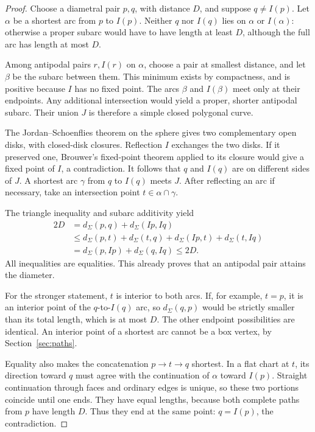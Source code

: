\documentclass[11pt]{article}
\theoremstyle{definition}
\newcommand{\surf}{\Sigma}
\newcommand{\dist}{d_{\surf}}
\begin{document}
\begin{proof}
Choose a diametral pair \(p,q\), with distance \(D\), and suppose
\(q\ne I(p)\). Let \(\alpha\) be a shortest arc from \(p\) to \(I(p)\).
Neither \(q\) nor \(I(q)\) lies on \(\alpha\) or \(I(\alpha)\):
otherwise a proper subarc would have to have length at least \(D\),
although the full arc has length at most \(D\).

Among antipodal pairs \(r,I(r)\) on \(\alpha\), choose a pair at
smallest distance, and let \(\beta\) be the subarc between them.
This minimum exists by compactness, and is positive because \(I\)
has no fixed point. The arcs \(\beta\) and \(I(\beta)\) meet only
at their endpoints. Any additional intersection would yield a proper,
shorter antipodal subarc. Their union \(J\) is therefore a simple
closed polygonal curve.

The Jordan--Schoenflies theorem on the sphere gives two complementary
open disks, with closed-disk closures. Reflection \(I\) exchanges the
two disks. If it preserved one, Brouwer's fixed-point theorem applied
to its closure would give a fixed point of \(I\), a contradiction.
It follows that \(q\) and \(I(q)\) are on different sides of \(J\).
A shortest arc \(\gamma\) from \(q\) to \(I(q)\) meets \(J\).
After reflecting an arc if necessary, take an intersection point
\(t\in\alpha\cap\gamma\).

The triangle inequality and subarc additivity yield
\[
\begin{aligned}
2D&=\dist(p,q)+\dist(Ip,Iq)\\
&\le\dist(p,t)+\dist(t,q)+\dist(Ip,t)+\dist(t,Iq)\\
&=\dist(p,Ip)+\dist(q,Iq)\le2D.
\end{aligned}
\]
All inequalities are equalities. This already proves that an
antipodal pair attains the diameter.

For the stronger statement, \(t\) is interior to both arcs. If, for
example, \(t=p\), it is an interior point of the \(q\)-to-\(I(q)\)
arc, so \(\dist(q,p)\) would be strictly smaller than its total length,
which is at most \(D\). The other endpoint possibilities are identical.
An interior point of a shortest arc cannot be a box vertex, by
Section~\ref{sec:paths}.

Equality also makes the concatenation \(p\to t\to q\) shortest.
In a flat chart at \(t\), its direction toward \(q\) must agree with
the continuation of \(\alpha\) toward \(I(p)\). Straight continuation
through faces and ordinary edges is unique, so these two portions
coincide until one ends. They have equal lengths, because both
complete paths from \(p\) have length \(D\). Thus they end at the
same point: \(q=I(p)\), the contradiction.
\end{proof}
\end{document}
